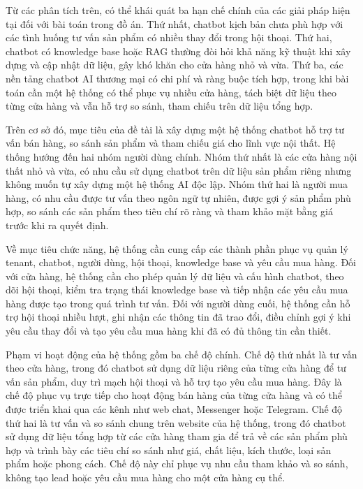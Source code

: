\documentclass[../DoAn.tex]{subfiles}
\begin{document}
Từ các phân tích trên, có thể khái quát ba hạn chế chính của các giải pháp hiện tại đối với bài toán trong đồ án. Thứ nhất, chatbot kịch bản chưa phù hợp với các tình huống tư vấn sản phẩm có nhiều thay đổi trong hội thoại. Thứ hai, chatbot có knowledge base hoặc RAG thường đòi hỏi khả năng kỹ thuật khi xây dựng và cập nhật dữ liệu, gây khó khăn cho cửa hàng nhỏ và vừa. Thứ ba, các nền tảng chatbot AI thương mại có chi phí và ràng buộc tích hợp, trong khi bài toán cần một hệ thống có thể phục vụ nhiều cửa hàng, tách biệt dữ liệu theo từng cửa hàng và vẫn hỗ trợ so sánh, tham chiếu trên dữ liệu tổng hợp.

Trên cơ sở đó, mục tiêu của đề tài là xây dựng một hệ thống chatbot hỗ trợ tư vấn bán hàng, so sánh sản phẩm và tham chiếu giá cho lĩnh vực nội thất. Hệ thống hướng đến hai nhóm người dùng chính. Nhóm thứ nhất là các cửa hàng nội thất nhỏ và vừa, có nhu cầu sử dụng chatbot trên dữ liệu sản phẩm riêng nhưng không muốn tự xây dựng một hệ thống AI độc lập. Nhóm thứ hai là người mua hàng, có nhu cầu được tư vấn theo ngôn ngữ tự nhiên, được gợi ý sản phẩm phù hợp, so sánh các sản phẩm theo tiêu chí rõ ràng và tham khảo mặt bằng giá trước khi ra quyết định.

Về mục tiêu chức năng, hệ thống cần cung cấp các thành phần phục vụ quản lý tenant, chatbot, người dùng, hội thoại, knowledge base và yêu cầu mua hàng. Đối với cửa hàng, hệ thống cần cho phép quản lý dữ liệu và cấu hình chatbot, theo dõi hội thoại, kiểm tra trạng thái knowledge base và tiếp nhận các yêu cầu mua hàng được tạo trong quá trình tư vấn. Đối với người dùng cuối, hệ thống cần hỗ trợ hội thoại nhiều lượt, ghi nhận các thông tin đã trao đổi, điều chỉnh gợi ý khi yêu cầu thay đổi và tạo yêu cầu mua hàng khi đã có đủ thông tin cần thiết.

Phạm vi hoạt động của hệ thống gồm ba chế độ chính. Chế độ thứ nhất là tư vấn theo cửa hàng, trong đó chatbot sử dụng dữ liệu riêng của từng cửa hàng để tư vấn sản phẩm, duy trì mạch hội thoại và hỗ trợ tạo yêu cầu mua hàng. Đây là chế độ phục vụ trực tiếp cho hoạt động bán hàng của từng cửa hàng và có thể được triển khai qua các kênh như web chat, Messenger hoặc Telegram. Chế độ thứ hai là tư vấn và so sánh chung trên website của hệ thống, trong đó chatbot sử dụng dữ liệu tổng hợp từ các cửa hàng tham gia để trả về các sản phẩm phù hợp và trình bày các tiêu chí so sánh như giá, chất liệu, kích thước, loại sản phẩm hoặc phong cách. Chế độ này chỉ phục vụ nhu cầu tham khảo và so sánh, không tạo lead hoặc yêu cầu mua hàng cho một cửa hàng cụ thể.
\end{document}
